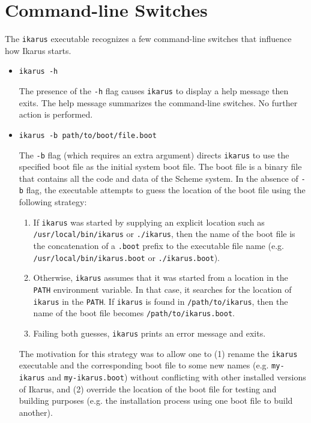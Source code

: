 \documentclass[onecolumn, 12pt, twoside, openright, dvipdfm]{book}
\begin{document}
\newpage

\section{Command-line Switches}

The \texttt{ikarus} executable recognizes a few command-line
switches that influence how Ikarus starts.

\begin{itemize}

\item \texttt{ikarus -h}

The presence of the \texttt{-h} flag causes \texttt{ikarus} to
display a help message then exits.  The help message summarizes the
command-line switches.  No further action is performed.

\item \texttt{ikarus -b path/to/boot/file.boot}

The \texttt{-b} flag (which requires an extra argument) directs
\texttt{ikarus} to use the specified boot file as the initial system
boot file.   The boot file is a binary file that
contains all the code and data of the Scheme system.  In the absence
of \texttt{-b} flag, the executable attempts to guess the location
of the boot file using the following strategy:
\begin{enumerate}

\item If \texttt{ikarus} was started by supplying an explicit
location such as
\texttt{/usr/local/bin/ikarus} or
\texttt{./ikarus},
then the name of the boot file is the concatenation of a
\texttt{.boot} prefix to the executable file name (e.g.
\texttt{/usr/local/bin/ikarus.boot} or \texttt{./ikarus.boot}).

\item Otherwise, \texttt{ikarus} assumes that it was started from a
location in the \texttt{PATH} environment variable.  In that case,
it searches for the location of \texttt{ikarus} in the
\texttt{PATH}.  If \texttt{ikarus} is found in
\texttt{/path/to/ikarus}, then the name of the boot file
becomes \texttt{/path/to/ikarus.boot}.

\item Failing both guesses, \texttt{ikarus} prints an error message
and exits.

\end{enumerate}

The motivation for this strategy was to allow one to (1) rename the
\texttt{ikarus} executable and the corresponding boot file to some
new names (e.g. \texttt{my-ikarus} and \texttt{my-ikarus.boot}) without
conflicting with other installed versions of Ikarus, and (2)
override the location of the boot file for testing and building
purposes (e.g. the installation process using one boot file to build
another).


\end{itemize}
\end{document}
